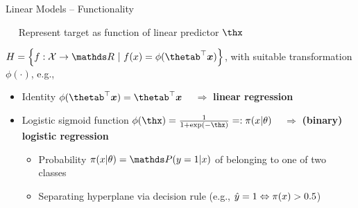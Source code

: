 \begin{vbframe}{Linear Models -- Functionality}

   
\medskip

 ~~ Represent target as function of linear predictor
$\thx$

\medskip


$\Hspace = \left\{f: \Xspace \to \R ~|~\fx = \phi(\thetab^\top \xv)\right\}$, 
with suitable transformation $\phi(\cdot)$, e.g.,

\begin{itemize}
  \item Identity $\phi(\thetab^\top \xv) = \thetab^\top \xv$ 
  ~ $\Rightarrow$ \textbf{linear regression}
  \item Logistic sigmoid function $\phi(\thx) = \frac{1}{1 + \exp(- \thx)} 
  =: \pixt$
  ~ $\Rightarrow$ \textbf{(binary) logistic regression}
  \begin{itemize}
    
    \item Probability $\pixt = \post$ of belonging to one of two classes
    \item Separating hyperplane via decision rule 
    (e.g., $\hat{y} = 1 \Leftrightarrow \pi(x) > 0.5$)
  \end{itemize}
\end{itemize}


\end{vbframe}
